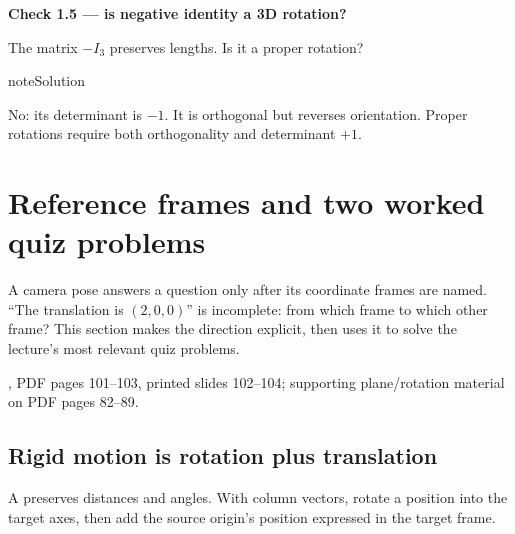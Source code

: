 \documentclass[letterpaper,11pt,english,openany,oneside]{jupyterBook}
\begin{document}
\begin{TextbookBox}
\textbf{Check 1.5 — is negative identity a 3D rotation?}\par\smallskip

\sphinxAtStartPar
The matrix \(-I_3\) preserves lengths. Is it a proper rotation?

\end{TextbookBox}

\begin{sphinxadmonition}{note}{Solution}

\sphinxAtStartPar
No: its determinant is \(-1\). It is orthogonal but reverses orientation. Proper rotations require both orthogonality and determinant \(+1\).
\end{sphinxadmonition}

\ignorespaces
{}\ignorespaces
{}\ignorespaces
{}\ignorespaces
{}\ignorespaces
{}\ignorespaces
\sphinxstepscope


\section{Reference frames and two worked quiz problems}
\label{\detokenize{lectures/lecture01/frames-quizzes:reference-frames-and-two-worked-quiz-problems}}\label{\detokenize{lectures/lecture01/frames-quizzes:lec01-frames}}\label{\detokenize{lectures/lecture01/frames-quizzes::doc}}
\sphinxAtStartPar
A camera pose answers a question only after its coordinate frames are named. “The translation is \((2,0,0)\)” is incomplete: from which frame to which other frame? This section makes the direction explicit, then uses it to solve the lecture’s most relevant quiz problems.

\sphinxAtStartPar
{} , PDF pages 101–103, printed slides 102–104; supporting plane/rotation material on PDF pages 82–89.


\subsection{Rigid motion is rotation plus translation}
\label{\detokenize{lectures/lecture01/frames-quizzes:rigid-motion-is-rotation-plus-translation}}
\sphinxAtStartPar
A  preserves distances and angles. With column vectors, rotate a position into the target axes, then add the source origin’s position expressed in the target frame.
\end{document}
